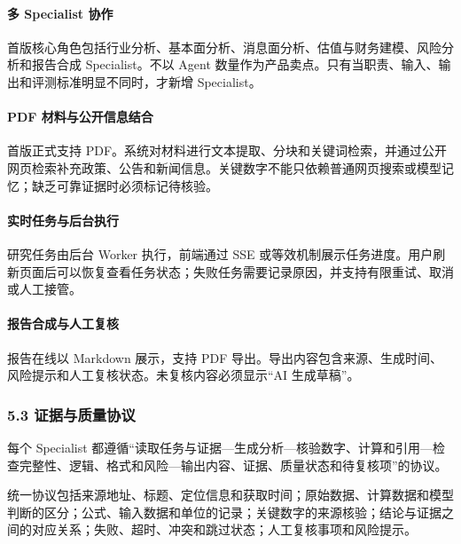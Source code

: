 \documentclass[a4paper,12pt,fontset=none]{ctexart}
\begin{document}
\paragraph{多 Specialist 协作}\label{ux591a-specialist-ux534fux4f5c}

首版核心角色包括行业分析、基本面分析、消息面分析、估值与财务建模、风险分析和报告合成
Specialist。不以 Agent
数量作为产品卖点。只有当职责、输入、输出和评测标准明显不同时，才新增
Specialist。

\paragraph{PDF
材料与公开信息结合}\label{pdf-ux6750ux6599ux4e0eux516cux5f00ux4fe1ux606fux7ed3ux5408}

首版正式支持
PDF。系统对材料进行文本提取、分块和关键词检索，并通过公开网页检索补充政策、公告和新闻信息。关键数字不能只依赖普通网页搜索或模型记忆；缺乏可靠证据时必须标记待核验。

\paragraph{实时任务与后台执行}\label{ux5b9eux65f6ux4efbux52a1ux4e0eux540eux53f0ux6267ux884c}

研究任务由后台 Worker 执行，前端通过 SSE
或等效机制展示任务进度。用户刷新页面后可以恢复查看任务状态；失败任务需要记录原因，并支持有限重试、取消或人工接管。

\paragraph{报告合成与人工复核}\label{ux62a5ux544aux5408ux6210ux4e0eux4ebaux5de5ux590dux6838}

报告在线以 Markdown 展示，支持 PDF
导出。导出内容包含来源、生成时间、风险提示和人工复核状态。未复核内容必须显示``AI
生成草稿''。

\subsubsection{5.3
证据与质量协议}\label{ux8bc1ux636eux4e0eux8d28ux91cfux534fux8bae}

每个 Specialist
都遵循``读取任务与证据---生成分析---核验数字、计算和引用---检查完整性、逻辑、格式和风险---输出内容、证据、质量状态和待复核项''的协议。

统一协议包括来源地址、标题、定位信息和获取时间；原始数据、计算数据和模型判断的区分；公式、输入数据和单位的记录；关键数字的来源核验；结论与证据之间的对应关系；失败、超时、冲突和跳过状态；人工复核事项和风险提示。
\end{document}
